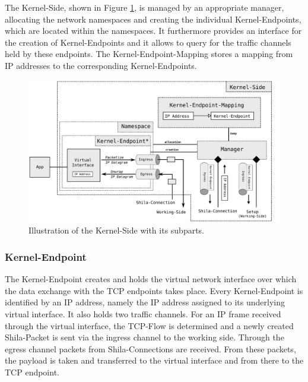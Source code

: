 The Kernel-Side, shown in Figure \ref{fig:ImplementationModulesKernelSide}, is managed by an appropriate manager, allocating the network namespaces and creating the individual Kernel-Endpoints, which are located within the namespaces. It furthermore provides an interface for the creation of Kernel-Endpoints and it allows to query for the traffic channels held by these endpoints. The Kernel-Endpoint-Mapping stores a mapping from IP addresses to the corresponding Kernel-Endpoints.  

\begin{figure}
	\begin{center}
		\def\svgwidth{1\textwidth}
		\includegraphics[scale=0.2]{../illustrations/implementation/ModulesKernelSide.pdf}   
		\caption[Caption for the list of figures.]{Illustration of the Kernel-Side with its subparts.}
		\label{fig:ImplementationModulesKernelSide}
	\end{center}
\end{figure}


\subsubsection{Kernel-Endpoint}

The Kernel-Endpoint creates and holds the virtual network interface over which the data exchange with the TCP endpoints takes place. Every Kernel-Endpoint is identified by an IP address, namely the IP address assigned to its underlying virtual interface. It also holds two traffic channels. For an IP frame received through the virtual interface, the TCP-Flow is determined and a newly created Shila-Packet is sent via the ingress channel to the working side. Through the egress channel packets from Shila-Connections are received. From these packets, the payload is taken and transferred to the virtual interface and from there to the TCP endpoint.

